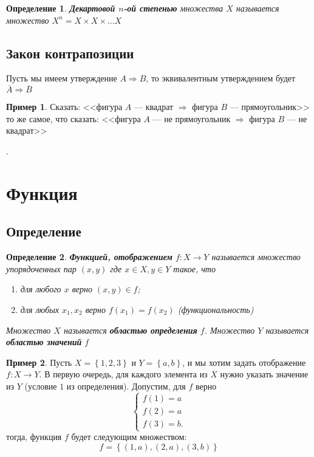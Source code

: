 \documentclass[]{article}
\theoremstyle{theorem}
\newtheorem{dfn}{Определение}
\theoremstyle{definition}
\newtheorem{ex}{Пример}
\begin{document}
	\begin{dfn}
	\textbf{Декартовой $n$-ой степенью} множества $X$ называется множество $X^n=X\times X\times \ldots X$ 
	\end{dfn}
	
	\subsection{Закон контрапозиции}
	
	Пусть мы имеем утверждение $A\Rightarrow B$, то эквивалентным утверждением будет $\overline{A}\Rightarrow \overline{B}$
	
	\begin{ex}
		Сказать: <<фигура $A$ --- квадрат $\Rightarrow$ фигура $B$ --- прямоугольник>> то же самое, что сказать: <<фигура $A$ --- не прямоугольник $\Rightarrow$ фигура $B$ --- не квадрат>>
	\end{ex}.
	
	\section{Функция}
	\subsection{Определение}
	\begin{dfn}
		\textbf{Функцией, отображением} $f:X\rightarrow Y$ называется множество  упорядоченных пар $(x,y)$ где $x\in X, y\in Y$ такое, что 
		\begin{enumerate}
			\item для любого $x$ верно  $(x,y)\in f$; 
			\item для любых $x_1, x_2$ верно  $f(x_1)=f(x_2)$
			(функциональность)
		\end{enumerate}
		Множество $X$ называется \textbf{областью определения} $f$.
		Множество $Y$ называется \textbf{областью значений} $f$
	\end{dfn}
	\begin{ex}
		Пусть $X=\left\{1,2,3\right\}$ и $Y=\left\{a,b\right\}$, и мы хотим задать отображение $f:X\rightarrow Y$. В первую очередь, для каждого элемента из $X$ нужно указать значение из $Y$ (условие $1$ из определения). Допустим, для $f$ верно
	\begin{equation}
	\begin{cases}
	f(1)=a
	\\
	f(2)=a
	\\
	f(3)=b.
\end{cases}
	\end{equation}
тогда, функция $f$ будет следующим множеством:
\begin{equation}
	f=\left\{(1,a),(2,a),(3,b)\right\}
\end{equation}
	\end{ex}
\end{document}

